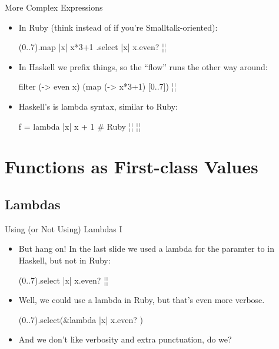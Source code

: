 \documentclass[xcolor=dvipsnames]{beamer}          %
\newcommand{\lO}[1]{\color{Black}{#1}}
\newcommand{\lH}[1]{\color{MidnightBlue}{#1}}
\begin{document}
\begin{frame}[fragile]{More Complex Expressions}
\begin{itemize}
    \item In Ruby (think  instead of  if you're
        Smalltalk-oriented):
        \begin{rlisting}
            (0..7).map { |x| x*3+1 } .select { |x| x.even? }
            ¦\lO{=> [4, 10, 16, 22]}¦
        \end{rlisting}
    \item In Haskell we prefix things, so the ``flow'' runs the other
        way around:
        \begin{hlisting}
            filter (\x -> even x) (map (\x -> x*3+1) [0..7])
            ¦\lO{[4,10,16,22]}¦
        \end{hlisting}
    \item Haskell's  is lambda syntax, similar to Ruby:
        \begin{rlisting}
            f = lambda { |x| x + 1 }     # Ruby
            ¦\lH{f = {\B}x -> x + 1}¦             ¦\lH{\HH Haskell}¦
        \end{rlisting}
\end{itemize}
\end{frame}


\section{Functions as First-class Values}

\subsection{Lambdas}

\begin{frame}[fragile]{Using (or Not Using) Lambdas I}
\begin{itemize}
    \item But hang on! In the last slide we used a lambda for the
        paramter to  in Haskell, but not in Ruby:
        \begin{rlisting}
            (0..7).select { |x| x.even? }
            ¦\lH{filter ({\B}x -> even x) [0..7]}¦
        \end{rlisting}
    \item Well, we could use a lambda in Ruby, but that's even more verbose.
        \begin{rlisting}
            (0..7).select(&lambda { |x| x.even? })
        \end{rlisting}
    \item And we don't like verbosity and extra punctuation, do we?
\end{itemize}
\end{frame}
\end{document}
